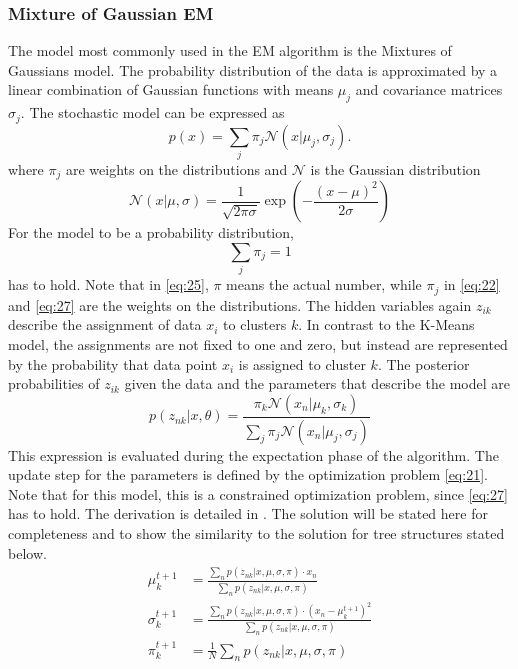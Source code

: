 \subsubsection{Mixture of Gaussian EM}
\label{sec:mixture-gaussian-em}
The model most commonly used in the EM algorithm is the Mixtures of Gaussians model.
The probability distribution of the data is approximated by a linear combination of Gaussian functions with means $\mu_j$ and covariance matrices $\sigma_j$.
The stochastic model can be expressed as
\begin{equation}
  \label{eq:22}
  p(x) = \sum_{j}\pi_j\mathcal{N}(x|\mu_j,\sigma_j).
\end{equation}
where $\pi_j$ are weights on the distributions and $\mathcal{N}$ is the Gaussian distribution
\begin{equation}
  \label{eq:25}
  \mathcal{N}(x|\mu,\sigma) = \frac{1}{\sqrt{2\pi\sigma}}\exp\left(-\frac{(x-\mu)^2}{2\sigma}\right)
\end{equation}
For the model to be a probability distribution,
\begin{equation}
  \label{eq:27}
  \sum_j\pi_j = 1
\end{equation}
has to hold.
Note that in \eqref{eq:25}, $\pi$ means the actual number, while $\pi_j$ in \eqref{eq:22} and \eqref{eq:27} are the weights on the distributions.
The hidden variables again $z_{ik}$ describe the  assignment of data $x_i$ to clusters $k$.
In contrast to the K-Means model, the assignments are not fixed to one and zero, but instead are represented by the probability that data point $x_i$ is assigned to cluster $k$.
The posterior probabilities of $z_{ik}$ given the data and the parameters that describe the model are
\begin{equation}
  \label{eq:26}
  p(z_{nk}|x, \theta) = \frac{\pi_k\mathcal{N}(x_n|\mu_k,\sigma_k)}{\sum_j\pi_j\mathcal{N}(x_n|\mu_j, \sigma_j)}
\end{equation}
This expression is evaluated during the expectation phase of the algorithm.
The update step for the parameters is defined by the optimization problem \eqref{eq:21}.
Note that for this model, this is a constrained optimization problem, since \eqref{eq:27} has to hold.
The derivation is detailed in \citet{Bishop2006}.
The solution will be stated here for completeness and to show the similarity to the solution for tree structures stated below.
\begin{align}
  \label{eq:29}
  \mu_k^{t+1} &= \frac{\sum_np(z_{nk}|x, \mu, \sigma, \pi)\cdot x_n}{\sum_np(z_{nk}|x, \mu, \sigma, \pi)}\\
  \sigma_k^{t+1}&= \frac{\sum_np(z_{nk}|x, \mu, \sigma, \pi)\cdot (x_n-\mu_k^{t+1})^2}{\sum_np(z_{nk}|x, \mu, \sigma, \pi)}\\
  \pi_k^{t+1}&= \frac{1}{N}\sum_{n}p(z_{nk}|x, \mu, \sigma, \pi)
\end{align}


